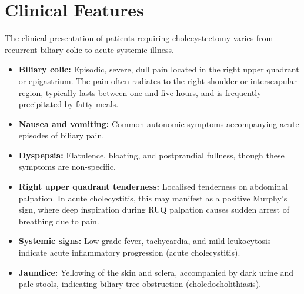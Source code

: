 \section*{Clinical Features}
The clinical presentation of patients requiring cholecystectomy varies from recurrent biliary colic to acute systemic illness.
\begin{itemize}
    \item \textbf{Biliary colic:} Episodic, severe, dull pain located in the right upper quadrant or epigastrium. The pain often radiates to the right shoulder or interscapular region, typically lasts between one and five hours, and is frequently precipitated by fatty meals.
    \item \textbf{Nausea and vomiting:} Common autonomic symptoms accompanying acute episodes of biliary pain.
    \item \textbf{Dyspepsia:} Flatulence, bloating, and postprandial fullness, though these symptoms are non-specific.
    \item \textbf{Right upper quadrant tenderness:} Localised tenderness on abdominal palpation. In acute cholecystitis, this may manifest as a positive Murphy's sign, where deep inspiration during RUQ palpation causes sudden arrest of breathing due to pain.
    \item \textbf{Systemic signs:} Low-grade fever, tachycardia, and mild leukocytosis indicate acute inflammatory progression (acute cholecystitis).
    \item \textbf{Jaundice:} Yellowing of the skin and sclera, accompanied by dark urine and pale stools, indicating biliary tree obstruction (choledocholithiasis).
\end{itemize}

